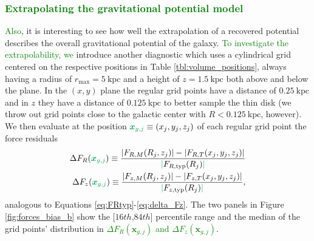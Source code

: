 \documentclass[iop,revtex4,numberedappendix,appendixfloats]{emulateapj}
\newcommand{\vect}[1]{\boldsymbol{#1}}
\newcommand{\NEW}[1]{\textcolor{Green}{#1}}
\newcommand{\OLD}[1]{}
\begin{document}
\subsubsection{\NEW{Extrapolating the gravitational potential model}}

\OLD{In addition}\NEW{Also}, it is interesting to see how well the extrapolation of a recovered potential describes the overall gravitational potential of the galaxy\OLD{, i.e., its predictive power}. \NEW{To investigate the extrapolability, we}\OLD{We} introduce\OLD{d} another diagnostic which uses a cylindrical grid centered on the respective positions in Table \ref{tbl:volume_positions}, always having a radius of $r_\text{max}=5~\text{kpc}$ and a height of $z=1.5~\text{kpc}$ both above and below the plane.  In the $(x,y)$ plane the regular grid points have a distance of $0.25~\text{kpc}$ and in $z$ they have a distance of  $0.125~\text{kpc}$ to better sample the thin disk (we throw out grid points close to the galactic center with $R<0.125~\text{kpc}$, however). We then evaluate at the position $\OLD{g_j}\NEW{\vect{x}_{g,j}} \equiv (x_j,y_j,z_j)$ of each regular grid point the force residuals
\begin{eqnarray}
\Delta F_R(\OLD{g_j}\NEW{\vect{x}_{g,j}}) \equiv \frac{|F_{R,M}(R_j,z_j)| - |F_{R,T}(x_j,y_j,z_j)|}{\NEW{|}F_{R,\text{typ}}(R_j)\NEW{|}} \label{eq:delta_FR_grid}\\
\Delta F_z(\OLD{g_j}\NEW{\vect{x}_{g,j}}) \equiv \frac{|F_{z,M}(R_j,z_j)| - |F_{z,T}(x_j,y_j,z_j)|}{\NEW{|}F_{z,\text{typ}}(R_j)\NEW{|}},\label{eq:delta_Fz_grid}
\end{eqnarray}
analogous to Equations \OLD{\eqref{eq:delta_FR}}\NEW{\eqref{eq:FRtyp}}-\eqref{eq:delta_Fz}. The two panels in Figure \ref{fig:forces_bias_b} show the [$16th$,$84th$] percentile range and the median of the grid points' distribution in \OLD{$\Delta F_R(g_j)$ and $\Delta F_z(g_j)$}\NEW{$\Delta F_R(\vect{x}_{g,j})$ and $\Delta F_z(\vect{x}_{g,j})$}.
\end{document}
